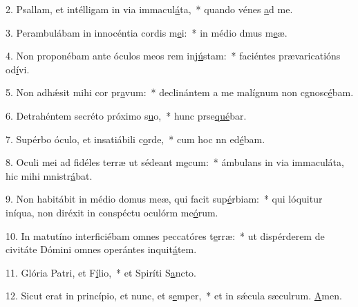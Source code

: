 2. Psallam, et intélligam in via immacul\uline{á}ta,~* quando vénes \uline{a}d me.\par 
3. Perambulábam in innocéntia cordis m\uline{e}i:~* in médio dmus m\uline{e}æ.\par 
4. Non proponébam ante óculos meos rem inj\uline{ú}stam:~* faciéntes prævaricatións od\uline{í}vi.\par 
5. Non adhǽsit mihi cor pr\uline{a}vum:~* declinántem a me malígnum non cgnosc\uline{é}bam.\par 
6. Detrahéntem secréto próximo s\uline{u}o,~* hunc prse\uline{qué}bar.\par 
7. Supérbo óculo, et insatiábili c\uline{o}rde,~* cum hoc nn ed\uline{é}bam.\par 
8. Oculi mei ad fidéles terræ ut sédeant m\uline{e}cum:~* ámbulans in via immaculáta, hic mihi mnistr\uline{á}bat.\par 
9. Non habitábit in médio domus meæ, qui facit sup\uline{é}rbiam:~* qui lóquitur iníqua, non diréxit in conspéctu oculórm me\uline{ó}rum.\par 
10. In matutíno interficiébam omnes peccatóres t\uline{e}rræ:~* ut dispérderem de civitáte Dómini omnes operántes inquit\uline{á}tem.\par 
11. Glória Patri, et F\uline{í}lio,~* et Spiríti S\uline{a}ncto.\par 
12. Sicut erat in princípio, et nunc, et s\uline{e}mper,~* et in sǽcula sæculrum. \uline{A}men.\par 
